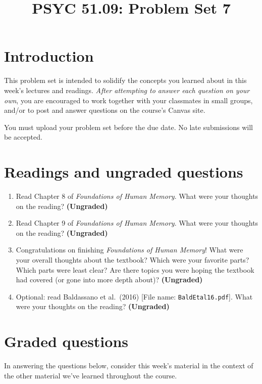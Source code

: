 \documentclass[11pt]{article}
\title{PSYC 51.09: Problem Set 7}
\date{}
\begin{document}
\maketitle
\vspace{-0.75in}
\section*{Introduction}
This problem set is intended to solidify the concepts you learned
about in this week's lectures and readings.  \textit{After attempting to answer
  each question on your own}, you are encouraged to work together with your classmates in small groups, and/or to post and answer questions on the course’s Canvas site.

You must upload your problem set before the due date.  No late submissions will be accepted.

\section*{Readings and ungraded questions}
\begin{enumerate}
\item Read Chapter 8 of \textit{Foundations of Human Memory}.  What were your thoughts on the reading?
  \textbf{(Ungraded)}

\item Read Chapter 9 of \textit{Foundations of Human Memory}.  What were your thoughts on the reading?
  \textbf{(Ungraded)}

\item Congratulations on finishing \textit{Foundations of Human
    Memory}!  What were your overall thoughts about the textbook?
  Which were your favorite parts?  Which parts were least clear?  Are
  there topics you were hoping the textbook had covered (or gone into
  more depth about)?  \textbf{(Ungraded)}

\item Optional: read Baldassano et al.\ (2016) [File name:
  \texttt{BaldEtal16.pdf}].  What
were your thoughts on the reading? \textbf{(Ungraded)}
\end{enumerate}

\section*{Graded questions}
In answering the questions below, consider this week's material in the
context of the other material we've learned throughout the course.
\end{document}
